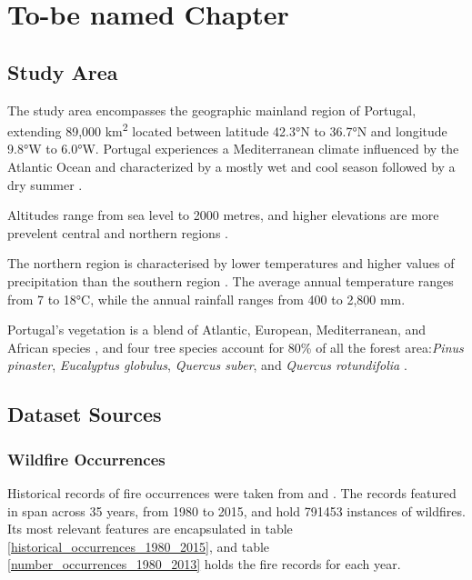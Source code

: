 \chapter{To-be named Chapter}
\label{sec:implementation}

\section{Study Area}
The study area encompasses the geographic mainland region of Portugal, extending 89,000 km\textsuperscript{2} located between latitude 42.3°N to 36.7°N and longitude 9.8°W to 6.0°W. Portugal experiences a Mediterranean climate influenced by the Atlantic Ocean and characterized by a mostly wet and cool season followed by a dry summer \cite{Mora2020, portugalClimate01, Marques2011}.

Altitudes range from sea level to  2000 metres, and higher elevations are more prevelent central and northern regions \cite{Marques2011}.

The northern region is characterised by lower temperatures and higher values of precipitation than the southern region \cite{Marques2011}. The average annual temperature ranges from 7 to 18°C, while the annual rainfall ranges from 400 to 2,800 mm.

Portugal's vegetation is a blend of Atlantic, European, Mediterranean, and African species \cite{britannica_portugal_climate}, and four tree species account for 80\% of all the forest area:\textit{Pinus pinaster}, \textit{Eucalyptus globulus}, \textit{Quercus suber}, and \textit{Quercus rotundifolia} \cite{Marques2011}.





\section{Dataset Sources}

\subsection{Wildfire Occurrences}
Historical records of fire occurrences were taken from \cite{centraldedados_incendios_website, centraldedados_incendios} and \cite{icnf2024}. The records featured in \cite{centraldedados_incendios_website, centraldedados_incendios} span across 35 years, from 1980 to 2015, and hold 791453 instances of wildfires. Its most relevant features are encapsulated in table \ref{historical_occurrences_1980_2015}, and table \ref{number_occurrences_1980_2013} holds the fire records for each year.


